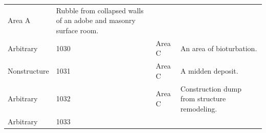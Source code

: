 \documentclass[
  12pt,
]{krantz}
\begin{document}
\begin{longtable}[]{@{}llll@{}}
\begin{minipage}[t]{0.16\columnwidth}
Area A\strut
\end{minipage} & \begin{minipage}[t]{0.38\columnwidth}\raggedright
Rubble from collapsed walls
of an adobe and masonry
surface room.\strut
\end{minipage}\tabularnewline
\begin{minipage}[t]{0.18\columnwidth}\raggedright
Arbitrary\strut
\end{minipage} & \begin{minipage}[t]{0.11\columnwidth}\raggedright
1030\strut
\end{minipage} & \begin{minipage}[t]{0.16\columnwidth}\raggedright
Area C\strut
\end{minipage} & \begin{minipage}[t]{0.38\columnwidth}\raggedright
An area of bioturbation.\strut
\end{minipage}\tabularnewline
\begin{minipage}[t]{0.18\columnwidth}\raggedright
Nonstructure\strut
\end{minipage} & \begin{minipage}[t]{0.11\columnwidth}\raggedright
1031\strut
\end{minipage} & \begin{minipage}[t]{0.16\columnwidth}\raggedright
Area C\strut
\end{minipage} & \begin{minipage}[t]{0.38\columnwidth}\raggedright
A midden deposit.\strut
\end{minipage}\tabularnewline
\begin{minipage}[t]{0.18\columnwidth}\raggedright
Arbitrary\strut
\end{minipage} & \begin{minipage}[t]{0.11\columnwidth}\raggedright
1032\strut
\end{minipage} & \begin{minipage}[t]{0.16\columnwidth}\raggedright
Area C\strut
\end{minipage} & \begin{minipage}[t]{0.38\columnwidth}\raggedright
Construction dump from
structure remodeling.\strut
\end{minipage}\tabularnewline
\begin{minipage}[t]{0.18\columnwidth}\raggedright
Arbitrary\strut
\end{minipage} & \begin{minipage}[t]{0.11\columnwidth}\raggedright
1033\strut
\end{minipage} & \begin{minipage}[t]{0.16\columnwidth}\raggedright

\end{minipage}
\end{longtable}
\end{document}
